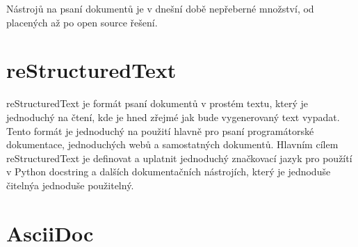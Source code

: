 Nástrojů na psaní dokumentů je v dnešní době nepřeberné množství, od placených až po open source řešení.

\section{reStructuredText}
reStructuredText je formát psaní dokumentů v prostém textu, který je jednoduchý na čtení, kde je hned zřejmé jak bude vygenerovaný text vypadat.
Tento formát je jednoduchý na použití hlavně pro psaní programátorské dokumentace, jednoduchých webů a samostatných dokumentů.
Hlavním cílem reStructuredText je definovat a uplatnit jednoduchý značkovací jazyk pro použítí v Python docstring a dalších dokumentačních nástrojích,
který je jednoduše čitelnýa jednoduše použitelný. \cite{reStruDoc}


\section{AsciiDoc}